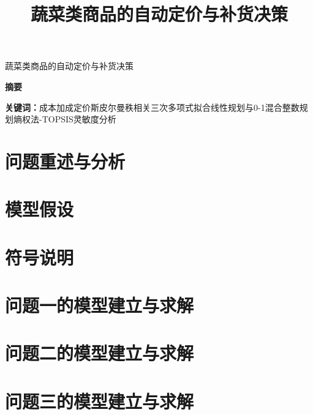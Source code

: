 \documentclass[12pt,a4paper,fontset=none]{ctexart}
\title{\textbf{蔬菜类商品的自动定价与补货决策}}
\date{}          %
\begin{document}
\begin{center}
{\LARGE\heiti 蔬菜类商品的自动定价与补货决策}
\end{center}
\vspace{0.8em}
\begin{center}{\heiti\bfseries\large 摘\quad 要}\end{center}
\vspace{-0.4em}


\vspace{0.4cm}   %
\par\noindent\textbf{关键词：}成本加成定价\quad 斯皮尔曼秩相关\quad 三次多项式拟合\quad 线性规划与0-1混合整数规划\quad 熵权法-TOPSIS\quad 灵敏度分析

\newpage   %

\section{问题重述与分析}


\section{模型假设}


\section{符号说明}


\section{问题一的模型建立与求解}


\section{问题二的模型建立与求解}


\section{问题三的模型建立与求解}

\end{document}
